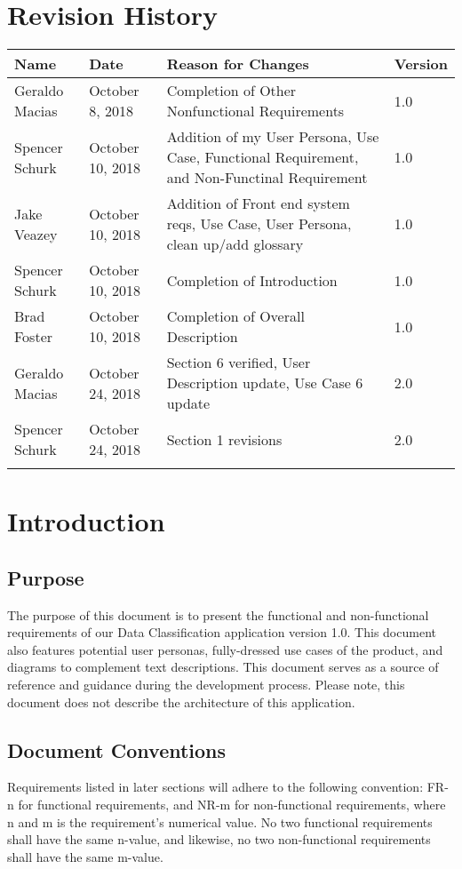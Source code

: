 \documentclass[12pt,oneside,letterpaper]{article}
\begin{document}
\section*{Revision History}
\begin{tabular}{|l|l|p{2.5in}|l|}
\hline
\textbf{Name}&\textbf{Date}&\textbf{Reason for Changes}&\textbf{Version}\\
\hline
Geraldo Macias&October 8, 2018&Completion of Other Nonfunctional Requirements&1.0\\
\hline
Spencer Schurk&October 10, 2018&Addition of my User Persona, Use Case, Functional Requirement, and Non-Functinal Requirement&1.0\\
\hline
Jake Veazey&October 10, 2018&Addition of Front end system reqs, Use Case, User Persona, clean up/add glossary&1.0\\
\hline
Spencer Schurk&October 10, 2018&Completion of Introduction&1.0\\
\hline
Brad Foster&October 10, 2018&Completion of Overall Description&1.0\\
\hline
Geraldo Macias&October 24, 2018&Section 6 verified, User Description update, Use Case 6 update&2.0\\
\hline
Spencer Schurk&October 24, 2018&Section 1 revisions&2.0\\
\hline
&&&\\
\hline
\end{tabular}

\newpage

\section{Introduction}
\subsection{Purpose}
The purpose of this document is to present the functional and non-functional requirements of our Data Classification application version 1.0. This document also features potential user personas, fully-dressed use cases of the product, and diagrams to complement text descriptions. This document serves as a source of reference and guidance during the development process. Please note, this document does not describe the architecture of this application.

\subsection{Document Conventions}
Requirements listed in later sections will adhere to the following convention: FR-n for functional requirements, and NR-m for non-functional requirements, where n and m is the requirement's numerical value. No two functional requirements shall have the same n-value, and likewise, no two non-functional requirements shall have the same m-value.
\end{document}
